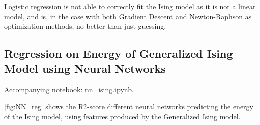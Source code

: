 Logistic regression is not able to correctly fit the Ising model as it is not a linear model, and is, in the case with both Gradient Descent and Newton-Raphson as optimization methods, no better than just guessing.





\subsection{Regression on Energy of Generalized Ising Model using Neural Networks}\label{sec:results NN reg}
Accompanying notebook: \href{https://github.com/nicolossus/FYS-STK4155-Project2/blob/master/notebooks/nn_ising.ipynb}{nn\_ising.ipynb}.

\autoref{fig:NN_reg} shows the R2-score different neural networks predicting the energy of the Ising model, using features produced by the Generalized Ising model.

